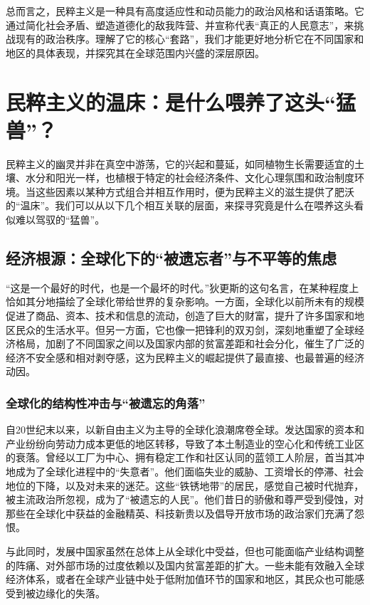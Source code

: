 \documentclass[UTF8, 10pt]{ctexbook}
\begin{document}
总而言之，民粹主义是一种具有高度适应性和动员能力的政治风格和话语策略。它通过简化社会矛盾、塑造道德化的敌我阵营、并宣称代表“真正的人民意志”，来挑战现有的政治秩序。理解了它的核心“套路”，我们才能更好地分析它在不同国家和地区的具体表现，并探究其在全球范围内兴盛的深层原因。

\section{民粹主义的温床：是什么喂养了这头“猛兽”？}
\lettrine[lines=2]{民}{粹主义}的幽灵并非在真空中游荡，它的兴起和蔓延，如同植物生长需要适宜的土壤、水分和阳光一样，也植根于特定的社会经济条件、文化心理氛围和政治制度环境。当这些因素以某种方式组合并相互作用时，便为民粹主义的滋生提供了肥沃的“温床”。我们可以从以下几个相互关联的层面，来探寻究竟是什么在喂养这头看似难以驾驭的“猛兽”。

\subsection{经济根源：全球化下的“被遗忘者”与不平等的焦虑}
“这是一个最好的时代，也是一个最坏的时代。”狄更斯的这句名言，在某种程度上恰如其分地描绘了全球化带给世界的复杂影响。一方面，全球化以前所未有的规模促进了商品、资本、技术和信息的流动，创造了巨大的财富，提升了许多国家和地区民众的生活水平。但另一方面，它也像一把锋利的双刃剑，深刻地重塑了全球经济格局，加剧了不同国家之间以及国家内部的贫富差距和社会分化，催生了广泛的经济不安全感和相对剥夺感，这为民粹主义的崛起提供了最直接、也最普遍的经济动因。

\subsubsection{全球化的结构性冲击与“被遗忘的角落”}
自20世纪末以来，以新自由主义为主导的全球化浪潮席卷全球。发达国家的资本和产业纷纷向劳动力成本更低的地区转移，导致了本土制造业的空心化和传统工业区的衰落。曾经以工厂为中心、拥有稳定工作和社区认同的蓝领工人阶层，首当其冲地成为了全球化进程中的“失意者”。他们面临失业的威胁、工资增长的停滞、社会地位的下降，以及对未来的迷茫。这些“铁锈地带”的居民，感觉自己被时代抛弃，被主流政治所忽视，成为了“被遗忘的人民”。他们昔日的骄傲和尊严受到侵蚀，对那些在全球化中获益的金融精英、科技新贵以及倡导开放市场的政治家们充满了怨恨。

与此同时，发展中国家虽然在总体上从全球化中受益，但也可能面临产业结构调整的阵痛、对外部市场的过度依赖以及国内贫富差距的扩大。一些未能有效融入全球经济体系，或者在全球产业链中处于低附加值环节的国家和地区，其民众也可能感受到被边缘化的失落。
\end{document}
